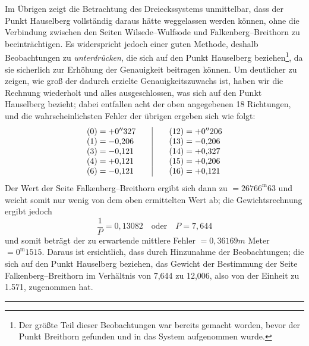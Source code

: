 Im Übrigen zeigt die Betrachtung des Dreieckssystems unmittelbar, dass der Punkt Hauselberg vollständig daraus hätte weggelassen werden können, ohne die Verbindung zwischen den Seiten Wilsede–Wulfsode und Falkenberg–Breithorn zu beeinträchtigen. Es widerspricht jedoch einer guten Methode, deshalb Beobachtungen zu \textit{unterdrücken}, die sich auf den Punkt Hauselberg beziehen\footnote{Der größte Teil dieser Beobachtungen war bereits gemacht worden, bevor der Punkt Breithorn gefunden und in das System aufgenommen wurde.}, da sie sicherlich zur Erhöhung der Genauigkeit beitragen können. Um deutlicher zu zeigen, wie groß der dadurch erzielte Genauigkeitszuwachs ist, haben wir die Rechnung wiederholt und alles ausgeschlossen, was sich auf den Punkt Hauselberg bezieht; dabei entfallen acht der oben angegebenen 18 Richtungen, und die wahrscheinlichsten Fehler der übrigen ergeben sich wie folgt:
\[
\begin{array}{r@{\;}l@{\qquad}|@{\qquad}r@{\;}l}
(0)=&+0''327&(12)=&+0''206\\
(1)=&-0{,}206&(13)=&-0{,}206\\
(3)=&-0{,}121&(14)=&+0{,}327\\
(4)=&+0{,}121&(15)=&+0{,}206\\
(6)=&-0{,}121&(16)=&+0{,}121
\end{array}
\]
Der Wert der Seite Falkenberg–Breithorn ergibt sich dann zu \(=26766^{\mathrm m}63\) und weicht somit nur wenig von dem oben ermittelten Wert ab; die Gewichtsrechnung ergibt jedoch
\[
\frac1P=0{,}13082\quad\text{oder}\quad P=7{,}644
\]
und somit beträgt der zu erwartende mittlere Fehler \(=0{,}36169m\) Meter \(=0^{\mathrm m}1515\). Daraus ist ersichtlich, dass durch Hinzunahme der Beobachtungen; die sich auf den Punkt Hauselberg beziehen, das Gewicht der Bestimmung der Seite Falkenberg–Breithorn im Verhältnis von 7,644 zu 12,006, also von der Einheit zu 1.571, zugenommen hat.
\par\medskip\begin{center}\rule{.28\textwidth}{.3pt}\end{center}
